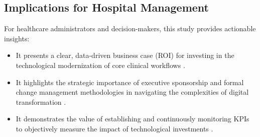 \subsection{Implications for Hospital Management}
For healthcare administrators and decision-makers, this study provides actionable insights:
\begin{itemize}
    \item It presents a clear, data-driven business case (ROI) for investing in the technological modernization of core clinical workflows \cite{rozenblum2020}.
    \item It highlights the strategic importance of executive sponsorship and formal change management methodologies in navigating the complexities of digital transformation \cite{may2013}.
    \item It demonstrates the value of establishing and continuously monitoring KPIs to objectively measure the impact of technological investments \cite{donabedian1988}.
\end{itemize} 
